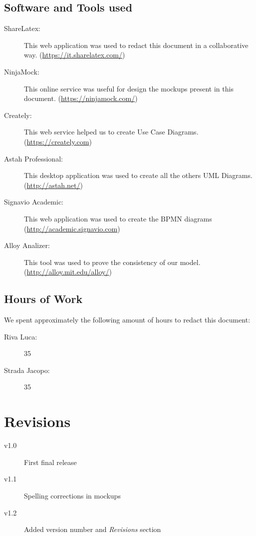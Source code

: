 \documentclass[a4paper]{article}
\let\stdsection\section
\renewcommand\section{\newpage\stdsection}
\begin{document}
\subsection{Software and Tools used}

\begin{description}
\item[ShareLatex:] This web application was used to redact this document in a collaborative way. 
\newline (\url{https://it.sharelatex.com/})
\item[NinjaMock:] This online service was useful for design the mockups present in this document.
\newline (\url{https://ninjamock.com/})
\item[Creately:] This web service helped us to create Use Case Diagrams.
\newline (\url{https://creately.com})
\item[Astah Professional:] This desktop application was used to create all the others UML Diagrams.
\newline (\url{http://astah.net/})
\item[Signavio Academic:] This web application was used to create the BPMN diagrams
\newline (\url{http://academic.signavio.com})
\item[Alloy Analizer:] This tool was used to prove the consistency of our model.
\newline (\url{http://alloy.mit.edu/alloy/})
\end{description}

\subsection{Hours of Work}
We spent approximately the following amount of hours to redact this document:
\begin{description}
\item[Riva Luca:] 35
\item[Strada Jacopo:] 35
\end{description}

\section{Revisions}
\begin{description}
    \item[v1.0] First final release
    \item[v1.1] Spelling corrections in mockups
    \item[v1.2] Added version number and \emph{Revisions} section
\end{description}
\end{document}
